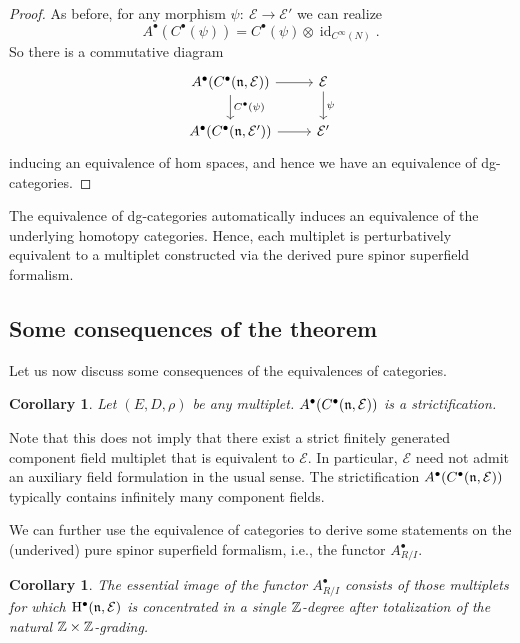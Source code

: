 \documentclass[pdftex]{sigma}
\numberwithin{equation}{section}
\newtheorem{cor}[thm]{Corollary}
\def\cE{\mathcal E}\def\cF{\mathcal F}\def\cG{\mathcal G}\def\cH{\mathcal H}
\def\bu{\bullet}
\DeclareMathOperator{\id}{id}
\begin{document}
\begin{proof}
	As before, for any morphism $\psi \colon \ \cE \to \cE'$ we can realize
	\begin{equation*}
	A^\bu(C^\bu(\psi)) = C^\bullet(\psi) \otimes \id_{C^\infty(N)} .
	\end{equation*}
	So there is a commutative diagram
	\begin{equation*}
	\begin{tikzcd}
	A^\bullet(C^\bullet(\fn,\cE)) \arrow[r] \arrow[d, "C^\bullet(\psi)"] & \cE \arrow[d , "\psi"] \\
	A^\bullet(C^\bullet(\fn,\cE')) \arrow[r] & \cE'
	\end{tikzcd}
	\end{equation*}
	inducing an equivalence of hom spaces, and hence we have an equivalence of dg-categories.
\end{proof}

\begin{rmk}
	The equivalence of dg-categories automatically induces an equivalence of the underlying homotopy categories. Hence, each multiplet is perturbatively equivalent to a multiplet constructed via the derived pure spinor superfield formalism.
\end{rmk}


\subsection{Some consequences of the theorem}
Let us now discuss some consequences of the equivalences of categories.

\begin{cor}
	Let $(E,D,\rho)$ be any multiplet. $A^\bullet(C^\bullet(\fn,\cE))$ is a strictification.
\end{cor}
Note that this does not imply that there exist a strict finitely generated component field multiplet that is equivalent to $\cE$. In particular, $\cE$ need not admit an auxiliary field formulation in the usual sense. The strictification $A^\bullet(C^\bullet(\fn,\cE))$ typically contains infinitely many component fields.

We can further use the equivalence of categories to derive some statements on the (underived) pure spinor superfield formalism, i.e., the functor $A^\bullet_{R/I}$.

\begin{cor} \label{underived_recognition_cor}
	The essential image of the functor $A^\bullet_{R/I}$ consists of those multiplets for which $\mathrm H^\bullet(\fn , \cE)$ is concentrated in a single $\mathbb Z$-degree after totalization of the natural $\mathbb Z \times \mathbb Z$-grading.
\end{cor}
\end{document}
